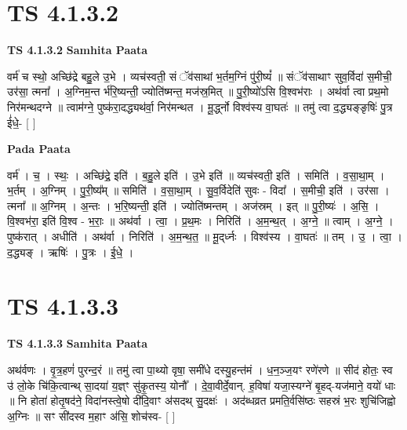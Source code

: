 \documentclass[17pt]{extarticle}
\begin{document}

\section{ TS 4.1.3.2 }

\textbf{TS 4.1.3.2 } \newline
\textbf{Samhita Paata} \newline

वर्म॑ च स्थो॒ अच्छि॑द्रे बहु॒ले उ॒भे । व्यच॑स्वती॒ सं ॅव॑साथां भ॒र्तम॒ग्निं पु॑री॒ष्यं᳚ ॥ संॅव॑साथाꣳ सुव॒र्विदा॑ स॒मीची॒ उर॑सा॒ त्मना᳚ । अ॒ग्निम॒न्त र्भ॑रि॒ष्यन्ती॒ ज्योति॑ष्मन्त॒ मज॑स्र॒मित् ॥ पु॒री॒ष्यो॑ऽसि वि॒श्वभ॑राः । अथ॑र्वा त्वा प्रथ॒मो निर॑मन्थदग्ने ॥ त्वाम॑ग्ने॒ पुष्क॑रा॒दद्ध्यथ॑र्वा॒ निर॑मन्थत । मू॒र्द्ध्नो विश्व॑स्य वा॒घतः॑ ॥ तमु॑ त्वा द॒द्ध्यङ्ङृषिः॑ पु॒त्र ई॑धे॒- [  ] \newline

\textbf{Pada Paata} \newline

वर्म॑ । च॒ । स्थः॒ । अच्छि॑द्रे॒ इति॑ । ब॒हु॒ले इति॑ । उ॒भे इति॑ ॥ व्यच॑स्वती॒ इति॑ । समिति॑ । व॒सा॒था॒म् । भ॒र्तम् । अ॒ग्निम् । पु॒री॒ष्य᳚म् ॥ समिति॑ । व॒सा॒था॒म् । सु॒व॒र्विदेति॑ सुवः - विदा᳚ । स॒मीची॒ इति॑ । उर॑सा । त्मना᳚ ॥ अ॒ग्निम् । अ॒न्तः । भ॒रि॒ष्यन्ती॒ इति॑ । ज्योति॑ष्मन्तम् । अज॑स्रम् । इत् ॥ पु॒री॒ष्यः॑ । अ॒सि॒ । वि॒श्वभ॑रा॒ इति॑ वि॒श्व - भ॒राः॒ ॥ अथ॑र्वा । त्वा॒ । प्र॒थ॒मः । निरिति॑ । अ॒म॒न्थ॒त् । अ॒ग्ने॒ ॥ त्वाम् । अ॒ग्ने॒ । पुष्क॑रात् । अधीति॑ । अथ॑र्वा । निरिति॑ । अ॒म॒न्थ॒त॒ ॥ मू॒द्‌र्ध्नः । विश्व॑स्य । वा॒घतः॑ ॥ तम् । उ॒ । त्वा॒ । द॒द्ध्यङ् । ऋषिः॑ । पु॒त्रः । ई॒धे॒ ।  \newline





\section{ TS 4.1.3.3 }

\textbf{TS 4.1.3.3 } \newline
\textbf{Samhita Paata} \newline

अथ॑र्वणः । वृ॒त्र॒हणं॑ पुरन्द॒रं ॥ तमु॑ त्वा पा॒थ्यो वृषा॒ समी॑धे दस्यु॒हन्त॑मं । ध॒न॒ञ्ज॒यꣳ रणे॑रणे ॥ सीद॑ होतः॒ स्व उ॑ लो॒के चि॑कि॒त्वान्थ् सा॒दया॑ य॒ज्ञ्ꣳ सु॑कृ॒तस्य॒ योनौ᳚ । दे॒वा॒वीर्दे॒वान्. ह॒विषा॑ यजा॒स्यग्ने॑ बृ॒हद्-यज॑माने॒ वयो॑ धाः ॥ नि होता॑ होतृ॒षद॑ने॒ विदा॑नस्त्वे॒षो दी॑दि॒वाꣳ अ॑सदथ् सु॒दक्षः॑ । अद॑ब्धव्रत प्रमति॒र्वसि॑ष्ठः सहस्रं भ॒रः शुचि॑जिह्वो अ॒ग्निः ॥ सꣳ सी॑दस्व म॒हाꣳ अ॑सि॒ शोच॑स्व- [  ] \newline
\end{document}
